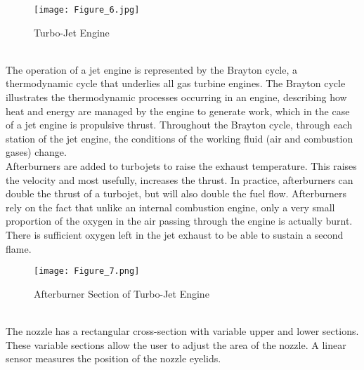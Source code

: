 \documentclass[12pt,a4paper]{article}
\begin{document}
\begin{figure}[!ht]
	\begin{center}
		\texttt{[image: Figure\_6.jpg]}
	\end{center}
	\caption{Turbo-Jet Engine}
\end{figure}\\
The operation of a jet engine is represented by the Brayton cycle, a thermodynamic cycle that underlies all gas turbine engines. The Brayton cycle illustrates the thermodynamic processes occurring in an engine, describing how heat and energy are managed by the engine to generate
work, which in the case of a jet engine is propulsive thrust. Throughout the Brayton cycle, through each station of the jet engine, the conditions of the working fluid (air and combustion gases) change.\\
\clearpage
\noindent
Afterburners are added to turbojets to raise the exhaust temperature. This raises the velocity and most usefully, increases the thrust. In practice, afterburners can double the thrust of a turbojet, but will also double the fuel flow. Afterburners rely on the fact that unlike an internal combustion engine, only a very small proportion of the oxygen in the air passing
through the engine is actually burnt. There is sufficient oxygen left in the jet exhaust to be able to sustain a second flame.\\
\begin{figure}[!ht]
	\begin{center}
		\texttt{[image: Figure\_7.png]}
	\end{center}
	\caption{Afterburner Section of Turbo-Jet Engine}
\end{figure}\\
The nozzle has a rectangular cross-section with variable upper and lower sections. These variable sections allow the user to adjust the area of the nozzle. A linear sensor measures the position of the nozzle eyelids.
\clearpage
\end{document}
